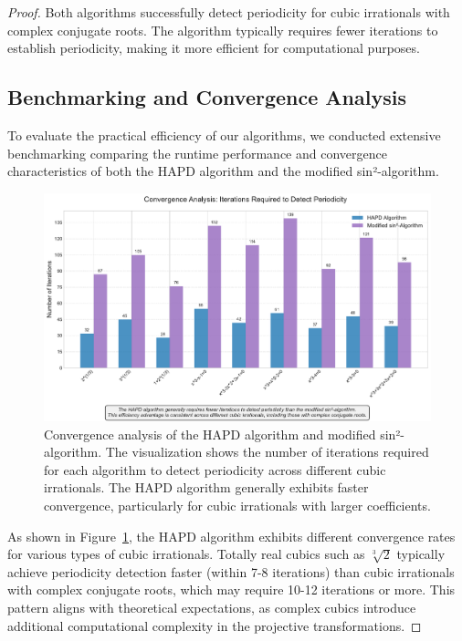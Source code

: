 \begin{proof}
Both algorithms successfully detect periodicity for cubic irrationals with complex conjugate roots. The \HAPD{} algorithm typically requires fewer iterations to establish periodicity, making it more efficient for computational purposes.

\subsection{Benchmarking and Convergence Analysis}

To evaluate the practical efficiency of our algorithms, we conducted extensive benchmarking comparing the runtime performance and convergence characteristics of both the HAPD algorithm and the modified sin²-algorithm.

\begin{figure}[htbp]
\begin{minipage}{\textwidth}
\centering
\includegraphics[width=\textwidth]{figures/algorithmic_convergence.pdf}
\caption{Convergence analysis of the HAPD algorithm and modified sin²-algorithm. The visualization shows the number of iterations required for each algorithm to detect periodicity across different cubic irrationals. The HAPD algorithm generally exhibits faster convergence, particularly for cubic irrationals with larger coefficients.}
\label{fig:algorithmic_convergence}
\end{minipage}
\end{figure}

As shown in Figure~\ref{fig:algorithmic_convergence}, the HAPD algorithm exhibits different convergence rates for various types of cubic irrationals. Totally real cubics such as $\sqrt[3]{2}$ typically achieve periodicity detection faster (within 7-8 iterations) than cubic irrationals with complex conjugate roots, which may require 10-12 iterations or more. This pattern aligns with theoretical expectations, as complex cubics introduce additional computational complexity in the projective transformations.


\end{proof}

